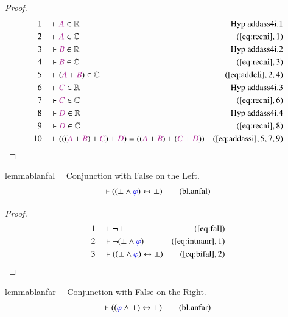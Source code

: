 \begin{proof}
\begin{align}
  1 &&  & \vdash \mc{A} \in
      \mathbb{R}&\text{Hyp~addass4i.1}\notag%
  \\ 2 &&  & \vdash \mc{A} \in \mathbb{C}&(\mbox{\ref{eq:recni}},1)\notag
  \\ 3 &&  & \vdash \mc{B} \in
      \mathbb{R}&\text{Hyp~addass4i.2}\notag%
  \\ 4 &&  & \vdash \mc{B} \in \mathbb{C}&(\mbox{\ref{eq:recni}},3)\notag
  \\ 5 &&  & \vdash ( \mc{A} + \mc{B} ) \in
      \mathbb{C}&(\mbox{\ref{eq:addcli}},2,4)\notag
  \\ 6 &&  & \vdash \mc{C} \in
      \mathbb{R}&\text{Hyp~addass4i.3}\notag%
  \\ 7 &&  & \vdash \mc{C} \in \mathbb{C}&(\mbox{\ref{eq:recni}},6)\notag
  \\ 8 &&  & \vdash \mc{D} \in
      \mathbb{R}&\text{Hyp~addass4i.4}\notag%
  \\ 9 &&  & \vdash \mc{D} \in \mathbb{C}&(\mbox{\ref{eq:recni}},8)\notag
  \\ 10 &&  & \vdash ( ( ( \mc{A} + \mc{B} ) + \mc{C} ) + \mc{D} ) = ( ( \mc{A}
      + \mc{B} ) + ( \mc{C} + \mc{D} )
      )&(\mbox{\ref{eq:addassi}},5,7,9)\notag
\end{align}
\end{proof}

\begin{restatable}{lemma}{blanfal}~~ Conjunction with False on the Left.
\begin{align}
\vdash ( ( \bot \wedge \mw{\varphi} ) \leftrightarrow \bot
    )\label{eq:bl.anfal}\tag{bl.anfal}
\end{align}
\end{restatable}

\begin{proof}
\begin{align}
  1 &&  & \vdash \lnot \bot&(\mbox{\ref{eq:fal}})\notag
  \\ 2 &&  & \vdash \lnot ( \bot \wedge \mw{\varphi}
      )&(\mbox{\ref{eq:intnanr}},1)\notag
  \\ 3 &&  & \vdash ( ( \bot \wedge \mw{\varphi} ) \leftrightarrow \bot
      )&(\mbox{\ref{eq:bifal}},2)\notag
\end{align}
\end{proof}

\begin{restatable}{lemma}{blanfar}~~ Conjunction with False on the Right.
\begin{align}
\vdash ( ( \mw{\varphi} \wedge \bot ) \leftrightarrow \bot
    )\label{eq:bl.anfar}\tag{bl.anfar}
\end{align}
\end{restatable}

